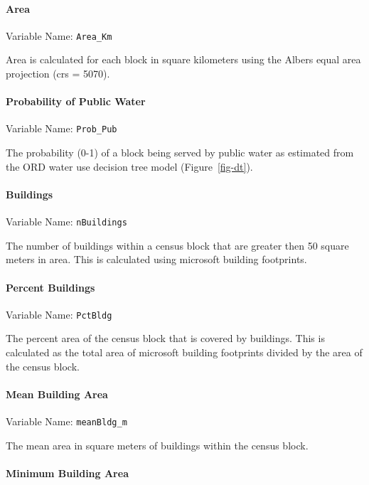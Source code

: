 \documentclass[
  letterpaper,
  DIV=11,
  numbers=noendperiod,
  oneside]{scrartcl}
\let\oldparagraph\paragraph
\renewcommand{\paragraph}[1]{\oldparagraph{#1}\mbox{}}
\begin{document}
\paragraph{Area}\label{area}

Variable Name: \texttt{Area\_Km}

Area is calculated for each block in square kilometers using the Albers
equal area projection (crs = 5070).

\paragraph{Probability of Public
Water}\label{probability-of-public-water}

Variable Name: \texttt{Prob\_Pub}

The probability (0-1) of a block being served by public water as
estimated from the ORD water use decision tree model
(Figure~\ref{fig-dt}).

\paragraph{Buildings}\label{buildings}

Variable Name: \texttt{nBuildings}

The number of buildings within a census block that are greater then 50
square meters in area. This is calculated using microsoft building
footprints.

\paragraph{Percent Buildings}\label{percent-buildings}

Variable Name: \texttt{PctBldg}

The percent area of the census block that is covered by buildings. This
is calculated as the total area of microsoft building footprints divided
by the area of the census block.

\paragraph{Mean Building Area}\label{mean-building-area}

Variable Name: \texttt{meanBldg\_m}

The mean area in square meters of buildings within the census block.

\paragraph{Minimum Building Area}\label{minimum-building-area}
\end{document}
